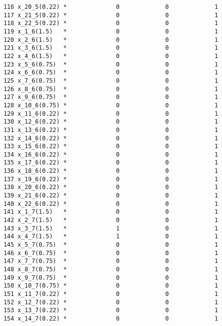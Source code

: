 \documentclass{article}[A4]
\begin{document}
\begin{verbatim}
	   116 x_20_5(0.22) *              0             0             1 
	   117 x_21_5(0.22) *              0             0             1 
	   118 x_22_5(0.22) *              0             0             1 
	   119 x_1_6(1.5)   *              0             0             1 
	   120 x_2_6(1.5)   *              0             0             1 
	   121 x_3_6(1.5)   *              0             0             1 
	   122 x_4_6(1.5)   *              0             0             1 
	   123 x_5_6(0.75)  *              0             0             1 
	   124 x_6_6(0.75)  *              0             0             1 
	   125 x_7_6(0.75)  *              0             0             1 
	   126 x_8_6(0.75)  *              0             0             1 
	   127 x_9_6(0.75)  *              0             0             1 
	   128 x_10_6(0.75) *              0             0             1 
	   129 x_11_6(0.22) *              0             0             1 
	   130 x_12_6(0.22) *              0             0             1 
	   131 x_13_6(0.22) *              0             0             1 
	   132 x_14_6(0.22) *              0             0             1 
	   133 x_15_6(0.22) *              0             0             1 
	   134 x_16_6(0.22) *              0             0             1 
	   135 x_17_6(0.22) *              0             0             1 
	   136 x_18_6(0.22) *              0             0             1 
	   137 x_19_6(0.22) *              0             0             1 
	   138 x_20_6(0.22) *              0             0             1 
	   139 x_21_6(0.22) *              0             0             1 
	   140 x_22_6(0.22) *              0             0             1 
	   141 x_1_7(1.5)   *              0             0             1 
	   142 x_2_7(1.5)   *              0             0             1 
	   143 x_3_7(1.5)   *              1             0             1 
	   144 x_4_7(1.5)   *              1             0             1 
	   145 x_5_7(0.75)  *              0             0             1 
	   146 x_6_7(0.75)  *              0             0             1 
	   147 x_7_7(0.75)  *              0             0             1 
	   148 x_8_7(0.75)  *              0             0             1 
	   149 x_9_7(0.75)  *              0             0             1 
	   150 x_10_7(0.75) *              0             0             1 
	   151 x_11_7(0.22) *              0             0             1 
	   152 x_12_7(0.22) *              0             0             1 
	   153 x_13_7(0.22) *              0             0             1 
	   154 x_14_7(0.22) *              0             0             1 

\end{verbatim}
\end{document}
